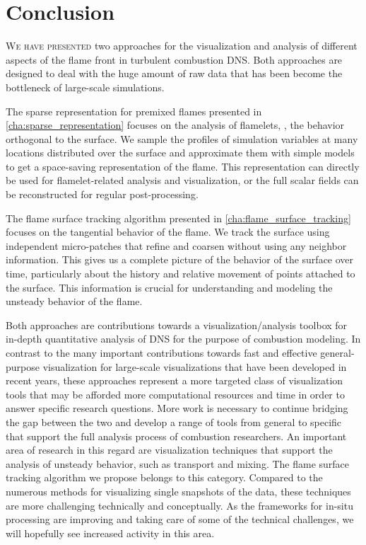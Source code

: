 \chapter{Conclusion} %
\label{cha:flame_vis_conclusions}
%
\lettrine[loversize=-0.015, findent=-1pt]{W}{e have presented} two approaches
for the visualization and analysis of different aspects of the flame front in
turbulent combustion \ac{DNS}.
%
Both approaches are designed to deal with the huge amount of raw data that has
been become the bottleneck of large-scale simulations.
%

%
The sparse representation for premixed flames presented in
\cref{cha:sparse_representation} focuses on the analysis of flamelets, \ie, the
behavior orthogonal to the surface.
%
We sample the profiles of simulation variables at many locations distributed
over the surface and approximate them with simple models to get a space-saving
representation of the flame.
%
This representation can directly be used for flamelet-related analysis and
visualization, or the full scalar fields can be reconstructed for regular
post-processing.
%

%
The flame surface tracking algorithm presented in
\cref{cha:flame_surface_tracking} focuses on the tangential behavior of the
flame.
%
We track the surface using independent micro-patches that refine and coarsen
without using any neighbor information.
%
This gives us a complete picture of the behavior of the surface over time,
particularly about the history and relative movement of points attached to the
surface.
%
This information is crucial for understanding and modeling the unsteady behavior
of the flame.
%

%
Both approaches are contributions towards a visualization/analysis toolbox for
in-depth quantitative analysis of \ac{DNS} for the purpose of combustion
modeling.
%
In contrast to the many important contributions towards fast and effective
general-purpose visualization for large-scale visualizations that have been
developed in recent years, these approaches represent a more targeted class
of visualization tools that may be afforded more computational resources and
time in order to answer specific research questions.
%
More work is necessary to continue bridging the gap between the two and
develop a range of tools from general to specific that support the full analysis
process of combustion researchers.
%
An important area of research in this regard are visualization techniques that
support the analysis of unsteady behavior, such as transport and mixing.
%
The flame surface tracking algorithm we propose belongs to this category.
%
Compared to the numerous methods for visualizing single snapshots of the data,
these techniques are more challenging technically and conceptually.
%
As the frameworks for in-situ processing are improving and taking care of some
of the technical challenges, we will hopefully see increased activity in this
area.
%
